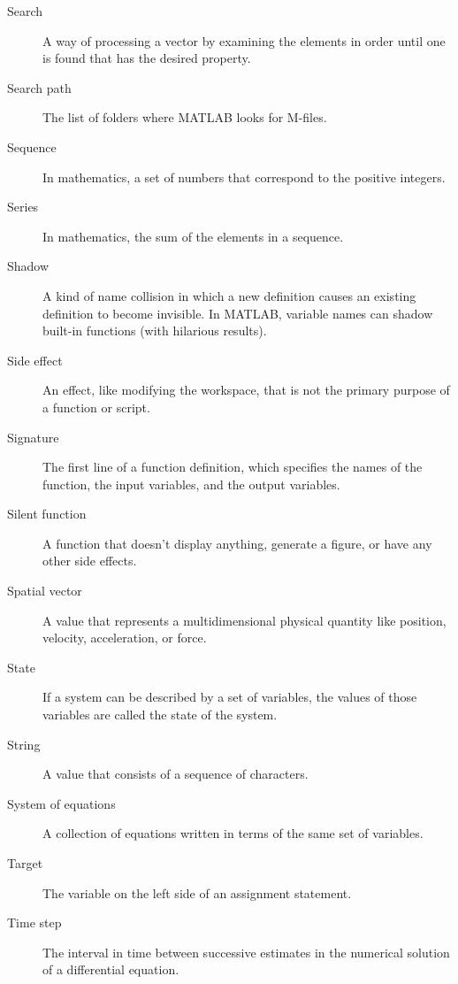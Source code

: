 \begin{description}
\item[Search] A way of processing a vector by examining the
elements in order until one is found that has the desired property.

\item[Search path] The list of folders where MATLAB looks for
M-files.

\item[Sequence] In mathematics, a set of numbers that correspond
to the positive integers.

\item[Series] In mathematics, the sum of the elements in a sequence.

\item[Shadow] A kind of name collision in which a new definition
causes an existing definition to become invisible.  In MATLAB,
variable names can shadow built-in functions (with hilarious results).

\item[Side effect] An effect, like modifying the workspace, that
is not the primary purpose of a function or script.

\item[Signature] The first line of a function definition, which
specifies the names of the function, the input variables, and the
output variables.

\item[Silent function] A function that doesn't display anything,
generate a figure, or have any other side effects.

\item[Spatial vector] A value that represents a
multidimensional physical quantity like position, velocity,
acceleration, or force.

\item[State] If a system can be described by a set of variables,
the values of those variables are called the state of the system.

\item[String] A value that consists of a sequence of characters.

\item[System of equations] A collection of equations written in terms of
the same set of variables.

\item[Target] The variable on the left side of an assignment statement.

\item[Time step] The interval in time between successive estimates
in the numerical solution of a differential equation.


\end{description}
